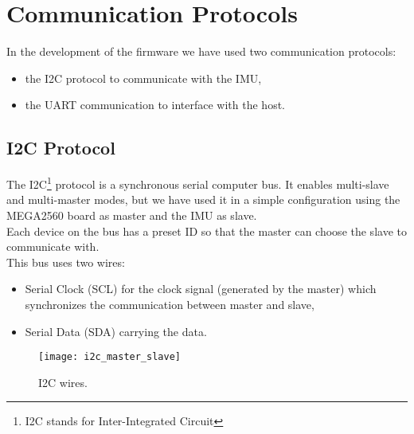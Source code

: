 \section{Communication Protocols}

In the development of the firmware we have used two communication protocols:
\begin{itemize}
	\item the I2C protocol to communicate with the IMU,
	\item the UART communication to interface with the host.
\end{itemize}
\subsection{I2C Protocol}

The I2C\footnote{I2C stands for Inter-Integrated Circuit} protocol is a synchronous serial computer bus. It enables multi-slave and multi-master modes, but we have used it in a simple configuration using the MEGA2560 board as master and the IMU as slave.\\

Each device on the bus has a preset ID so that the master can choose the slave to communicate with.\\
This bus uses two wires:
\begin{itemize}
	\item Serial Clock (SCL) for the clock signal (generated by the master) which synchronizes the communication between master and slave,
	\item Serial Data (SDA) carrying the data.
\end{itemize}

\begin{figure}[!ht]
	\texttt{[image: i2c\_master\_slave]}
	\captionsetup{justification=centering, margin=1.5cm}
	\centering
	\caption{I2C wires.}
	\centering
\end{figure}


